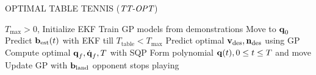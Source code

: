 \begin{algorithm}[tb]
   \caption{OPTIMAL TABLE TENNIS ($\emph{TT-OPT}$)}
   \label{alg1}
\begin{algorithmic}
    $T_{\mathrm{max}} > 0$, 
   \STATE Initialize EKF
   \STATE Train GP models from demonstrations
   \STATE Move to $\boldsymbol{\mathrm{q}}_0$
   \REPEAT 
	   \STATE Predict $\boldsymbol{\mathrm{b}}_{\mathrm{est}}(t)$ with EKF till $T_{\mathrm{table}} < T_{\mathrm{max}}$
	   \STATE Predict optimal $\boldsymbol{\mathrm{v}}_{\mathrm{des}}, \boldsymbol{\mathrm{n}}_{\mathrm{des}}$ using GP
	   \STATE Compute optimal $\boldsymbol{\mathrm{q}}_f, \dot{\boldsymbol{\mathrm{q}}}_f, T$ with SQP
	   \STATE Form polynomial $\boldsymbol{\mathrm{q}}(t), 0 \leq t \leq T$ and move
	   \STATE Update GP with $\boldsymbol{\mathrm{b}}_{\mathrm{land}}$	
   \UNTIL opponent stops playing
\end{algorithmic}
\end{algorithm}